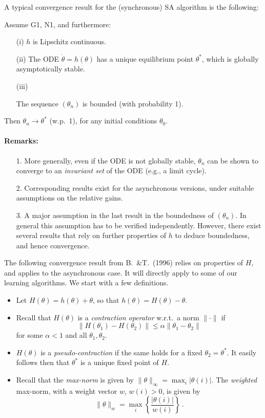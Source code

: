 A typical convergence result for the (synchronous) SA algorithm is the following:

\begin{theorem}\label{thm:SA_1}
Assume G1, N1, and furthermore:
\begin{itemize}
\item[(i)]
$h$ is Lipschitz continuous.
\item[(ii)]
The ODE $\dot\theta=h(\theta)$ has a unique equilibrium point $\theta^*$, which
is globally asymptotically stable.
\item[(iii)]

The sequence $(\theta_n)$ is bounded (with probability 1).
\end{itemize}
Then $\theta_n\to\theta^*$ (w.p.~1), for any initial conditions $\theta_0$.
\end{theorem}


\paragraph{Remarks:}
\begin{itemize}
\item[1.]
More generally, even if the ODE is not globally stable, $\theta_n$ can be shown to converge
to an {\em invariant set} of the ODE (e.g., a limit cycle).
\item[2.]
Corresponding results exist for the asynchronous versions, under suitable
assumptions on the relative gains.
\item[3.]
A major assumption in the last result in the boundedness of $(\theta_n)$.
In general this assumption has to be verified independently. However, there
exist several results that rely on further properties of $h$ to deduce
boundedness, and hence convergence.
\end{itemize}


The following convergence result from B.~\&T.~(1996) relies on
  properties of $H$, and applies to the
asynchronous case.
It will directly apply to some of our learning algorithms.
We start with a few definitions.

\begin{itemize}
\item
Let $H(\theta) = h(\theta) + \theta$, so that $h(\theta) = H(\theta) - \theta$.
\item
Recall that $H(\theta)$ is a {\em contraction operator} w.r.t.\ a norm
$\|\cdot\|$ if
$$
\| H(\theta_1) - H(\theta_2)\| \le \alpha \| \theta_1 - \theta_2\|
$$
for some $\alpha < 1$ and all $\theta_1, \theta_2$.
\item
$H(\theta)$ is a {\em pseudo-contraction} if the same holds for a
fixed $\theta_2=\theta^*$.
It easily follows then that $\theta^*$ is a unique fixed point of $H$.
\item
Recall that the {\em max-norm} is given by
$\|\theta\|_\infty = \max_i |\theta(i)|$.
The {\em weighted} max-norm, with a weight vector $w$, $w(i) > 0$, is given by
$$
\|\theta\|_w = \max_i \left\{ \frac{|\theta(i)|}{w(i)}\right\} 
\,.
$$
\end{itemize}

